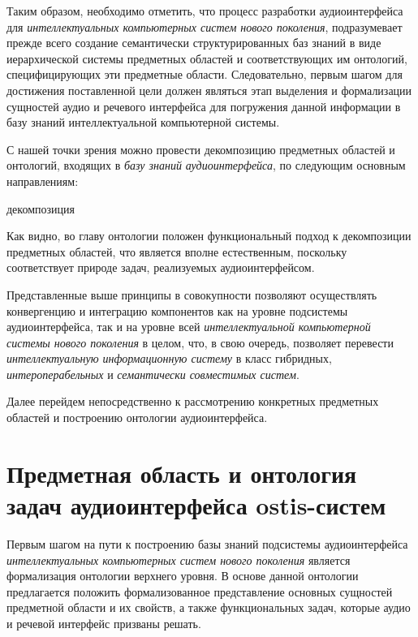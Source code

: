 Таким образом, необходимо отметить, что процесс разработки аудиоинтерфейса для \textit{интеллектуальных компьютерных систем нового поколения}, подразумевает прежде всего создание семантически структурированных баз знаний в виде иерархической системы предметных областей и соответствующих им онтологий, специфицирующих эти предметные области. Следовательно, первым шагом для достижения поставленной цели должен являться этап выделения и формализации сущностей аудио и речевого интерфейса для погружения данной информации в базу знаний интеллектуальной компьютерной системы.

С нашей точки зрения можно провести декомпозицию предметных областей и онтологий, входящих в \textit{базу знаний} \textit{аудиоинтерфейса}, по следующим основным направлениям:

\begin{SCn}
	\begin{scnrelfromset}{декомпозиция}
	\end{scnrelfromset}
\end{SCn}

Как видно, во главу онтологии положен функциональный подход к декомпозиции предметных областей, что является вполне естественным, поскольку соответствует природе задач, реализуемых аудиоинтерфейсом.

Представленные выше принципы в совокупности позволяют осуществлять конвергенцию и интеграцию компонентов как на уровне подсистемы аудиоинтерфейса, так и на уровне всей \textit{интеллектуальной компьютерной системы нового поколения} в целом, что, в свою очередь, позволяет перевести \textit{интеллектуальную информационную систему} в класс гибридных, \textit{интероперабельных} и \textit{семантически совместимых систем}.
  
 Далее перейдем непосредственно к рассмотрению конкретных предметных областей и построению онтологии аудиоинтерфейса.

\section{Предметная область и онтология задач аудиоинтерфейса ostis-систем}
\label{sec_audio_interfaces_subject_area_problems}

Первым шагом на пути к построению базы знаний подсистемы аудиоинтерфейса \textit{интеллектуальных компьютерных систем нового поколения} является формализация онтологии верхнего уровня. В основе данной онтологии предлагается положить формализованное представление основных сущностей предметной области и их свойств, а также функциональных задач, которые аудио и речевой интерфейс призваны решать. 

